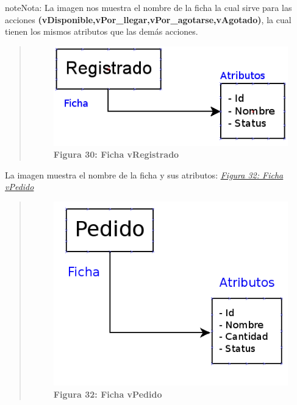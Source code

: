 \documentclass[letterpaper,11pt,spanish]{sphinxmanual}
\begin{document}
\begin{notice}{note}{Nota:}
La imagen nos muestra el nombre de la ficha la cual sirve para las acciones \textbf{(vDisponible,vPor\_llegar,vPor\_agotarse,vAgotado)}, la cual tienen los mismos atributos que las demás acciones.
\begin{quote}
\begin{figure}[htbp]
\centering
\capstart

\includegraphics{ficha1.png}
\caption{\textbf{Figura 30: Ficha vRegistrado}}\label{_templates/Contenido6/Parte5:figura45}\end{figure}
\end{quote}

La imagen muestra el nombre de la ficha y sus atributos: {\hyperref[_templates/Contenido6/Parte5:figura50]{\emph{Figura 32: Ficha vPedido}}}
\begin{quote}
\begin{figure}[htbp]
\centering
\capstart

\includegraphics{ficha2.png}
\caption{\textbf{Figura 32: Ficha vPedido}}\label{_templates/Contenido6/Parte5:figura50}\end{figure}
\end{quote}
\end{notice}
\end{document}
